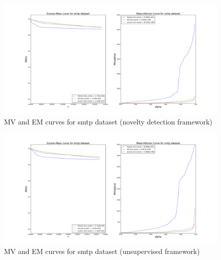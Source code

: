 \begin{figure}[!ht]
\label{evaluation:mv_em_smtp}
  \centering
  \caption{MV and EM curves for smtp dataset (novelty detection framework)}
  \includegraphics[trim=172 52 165 70, clip, width=\linewidth]{fig_source/evaluation_fig/mv_em_smtp_supervised_09_factorized.png}
\end{figure}
\begin{figure}[!ht]
\label{evaluation:mv_em_smtp_unsupervised}
  \centering
  \caption{MV and EM curves for smtp dataset (unsupervised framework)}
  \includegraphics[trim=172 52 165 70, clip, width=\linewidth]{fig_source/evaluation_fig/mv_em_smtp_unsupervised_09_factorized.png}
\end{figure}

